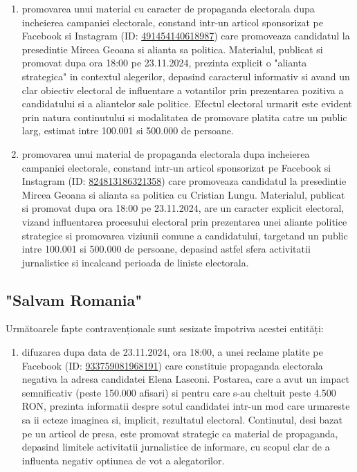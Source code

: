 \documentclass[a4paper,12pt]{article}
\begin{document}
\begin{enumerate}[leftmargin=*, label=\arabic*.)]
    \item promovarea unui material cu caracter de propaganda electorala dupa incheierea campaniei electorale, constand intr-un articol sponsorizat pe Facebook si Instagram (ID: \href{https://www.facebook.com/ads/library/?id=491454140618987}{491454140618987}) care promoveaza candidatul la presedintie Mircea Geoana si alianta sa politica. Materialul, publicat si promovat dupa ora 18:00 pe 23.11.2024, prezinta explicit o "alianta strategica" in contextul alegerilor, depasind caracterul informativ si avand un clar obiectiv electoral de influentare a votantilor prin prezentarea pozitiva a candidatului si a aliantelor sale politice. Efectul electoral urmarit este evident prin natura continutului si modalitatea de promovare platita catre un public larg, estimat intre 100.001 si 500.000 de persoane.
    \item promovarea unui material de propaganda electorala dupa incheierea campaniei electorale, constand intr-un articol sponsorizat pe Facebook si Instagram (ID: \href{https://www.facebook.com/ads/library/?id=824813186321358}{824813186321358}) care promoveaza candidatul la presedintie Mircea Geoana si alianta sa politica cu Cristian Lungu. Materialul, publicat si promovat dupa ora 18:00 pe 23.11.2024, are un caracter explicit electoral, vizand influentarea procesului electoral prin prezentarea unei aliante politice strategice si promovarea viziunii comune a candidatului, targetand un public intre 100.001 si 500.000 de persoane, depasind astfel sfera activitatii jurnalistice si incalcand perioada de liniste electorala.
\end{enumerate}

\vspace{0.5cm}

\subsection{"Salvam Romania"}
Următoarele fapte contravenționale sunt sesizate împotriva acestei entități:

\begin{enumerate}[leftmargin=*, label=\arabic*.)]
    \item difuzarea dupa data de 23.11.2024, ora 18:00, a unei reclame platite pe Facebook (ID: \href{https://www.facebook.com/ads/library/?id=933759081968191}{933759081968191}) care constituie propaganda electorala negativa la adresa candidatei Elena Lasconi. Postarea, care a avut un impact semnificativ (peste 150.000 afisari) si pentru care s-au cheltuit peste 4.500 RON, prezinta informatii despre sotul candidatei intr-un mod care urmareste sa ii ecteze imaginea si, implicit, rezultatul electoral. Continutul, desi bazat pe un articol de presa, este promovat strategic ca material de propaganda, depasind limitele activitatii jurnalistice de informare, cu scopul clar de a influenta negativ optiunea de vot a alegatorilor.
\end{enumerate}
\end{document}
